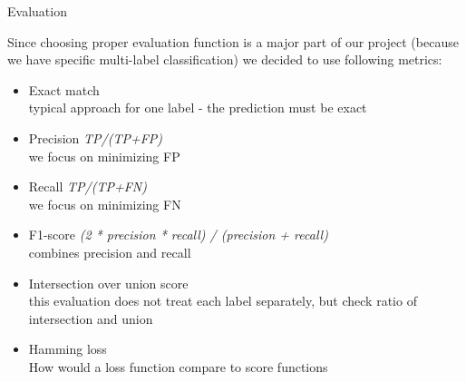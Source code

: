 \documentclass{beamer}
\begin{document}
\begin{frame}[t]{Evaluation}

\vspace{-3mm}

Since choosing proper evaluation function is a major part of our project (because we have specific multi-label classification) we decided to use following metrics:
	
\begin{itemize}
	
\pause
\item Exact match \\
typical approach for one label - the prediction must be exact
	
\pause
\item Precision {\it TP/(TP+FP)} \\
we focus on minimizing FP

\pause
\item Recall {\it TP/(TP+FN)} \\
we focus on minimizing FN

\pause
\item F1-score {\it (2 * precision * recall) / (precision + recall)} \\
combines precision and recall

\pause
\item Intersection over union score \\
this evaluation does not treat each label separately, but check ratio of intersection and union

\pause
\item Hamming loss \\
How would a loss function compare to score functions
\end{itemize}
\end{frame}
\end{document}
